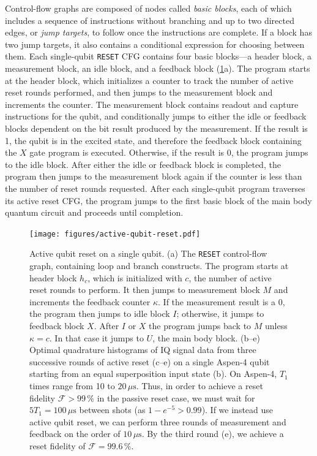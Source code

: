 \documentclass[12pt]{iopart}
\begin{document}
Control-flow graphs are composed of nodes called \textit{basic blocks}, each of which includes a sequence of instructions without branching and up to two directed edges, or \textit{jump targets}, to follow once the instructions are complete. If a block has two jump targets, it also contains a conditional expression for choosing between them. Each single-qubit \texttt{RESET} CFG contains four basic blocks---a header block, a measurement block, an idle block, and a feedback block (\cref{fig:Active-Reset}a). The program starts at the header block, which initializes a counter to track the number of active reset rounds performed, and then jumps to the measurement block and increments the counter. The measurement block contains readout and capture instructions for the qubit, and conditionally jumps to either the idle or feedback blocks dependent on the bit result produced by the measurement. If the result is 1, the qubit is in the excited state, and therefore the feedback block containing the $X$ gate program is executed. Otherwise, if the result is 0, the program jumps to the idle block. After either the idle or feedback block is completed, the program then jumps to the measurement block again if the counter is less than the number of reset rounds requested. After each single-qubit program traverses its active reset CFG, the program jumps to the first basic block of the main body quantum circuit and proceeds until completion.

\begin{figure}
    \centering
    \texttt{[image: figures/active-qubit-reset.pdf]}
    \caption{
    Active qubit reset on a single qubit. (a) The \texttt{RESET} control-flow graph, containing loop and branch constructs. The program starts at header block $h_c$, which is initialized with $c$, the number of active reset rounds to perform. It then jumps to measurement block $M$ and increments the feedback counter $\kappa$. If the measurement result is a 0, the program then jumps to idle block $I$; otherwise, it jumps to feedback block $X$. After $I$ or $X$ the program jumps back to $M$ unless $\kappa = c$. In that case it jumps to $U$, the main body block. (b--e) Optimal quadrature histograms of IQ signal data from three successive rounds of active reset (c--e) on a single Aspen-4 qubit starting from an equal superposition input state (b). On Aspen-4, $T_1$ times range from 10 to $20\,\mu\mathrm{s}$. Thus, in order to achieve a reset fidelity $\mathcal{F} > 99\,\%$ in the passive reset case, we must wait for $5 T_1 = 100\,\mu\mathrm{s}$ between shots (as $1 - e^{-5} > 0.99$). If we instead use active qubit reset, we can perform three rounds of measurement and feedback on the order of $10\,\mu \mathrm{s}$. By the third round (e), we achieve a reset fidelity of $\mathcal{F} = 99.6\,\%$.
    }
    \label{fig:Active-Reset}
\end{figure}
\end{document}
